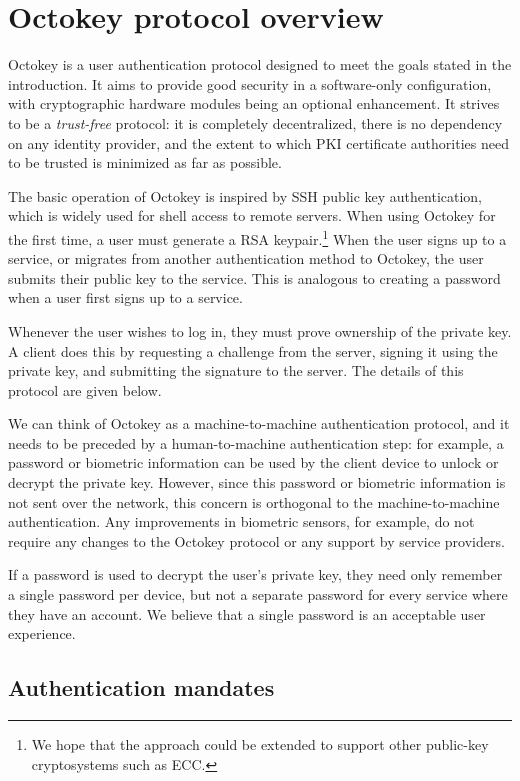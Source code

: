 \section{Octokey protocol overview}

Octokey is a user authentication protocol designed to meet the goals stated in the introduction. It
aims to provide good security in a software-only configuration, with cryptographic hardware modules
being an optional enhancement. It strives to be a \emph{trust-free} protocol: it is completely
decentralized, there is no dependency on any identity provider, and the extent to which PKI
certificate authorities need to be trusted is minimized as far as possible.

The basic operation of Octokey is inspired by SSH public key authentication, which is widely used
for shell access to remote servers. When using Octokey for the first time, a user must generate a
RSA keypair.\footnote{We hope that the approach could be extended to support other public-key
cryptosystems such as ECC.} When the user signs up to a service, or migrates from another
authentication method to Octokey, the user submits their public key to the service. This is
analogous to creating a password when a user first signs up to a service.

Whenever the user wishes to log in, they must prove ownership of the private key. A client does this
by requesting a challenge from the server, signing it using the private key, and submitting the
signature to the server. The details of this protocol are given below.

We can think of Octokey as a machine-to-machine authentication protocol, and it needs to be preceded
by a human-to-machine authentication step: for example, a password or biometric information can be
used by the client device to unlock or decrypt the private key. However, since this password or
biometric information is not sent over the network, this concern is orthogonal to the
machine-to-machine authentication. Any improvements in biometric sensors, for example, do not
require any changes to the Octokey protocol or any support by service providers.

If a password is used to decrypt the user's private key, they need only remember a single password
per device, but not a separate password for every service where they have an account. We believe
that a single password is an acceptable user experience.

\subsection{Authentication mandates}\label{sec:mandates}

